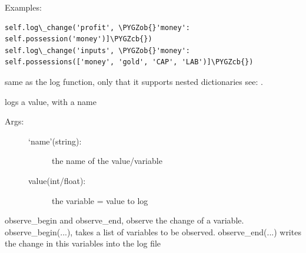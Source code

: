 \documentclass[letterpaper,10pt,english]{sphinxmanual}
\def\PYGZob{\char`\{}
\def\PYGZcb{\char`\}}
\begin{document}
\begin{fulllineitems}
\begin{fulllineitems}
Examples:

\begin{Verbatim}[commandchars=\\\{\}]
self.log\_change('profit', \PYGZob{}'money': self.possession('money')]\PYGZcb{})
self.log\_change('inputs', \PYGZob{}'money': self.possessions(['money', 'gold', 'CAP', 'LAB')]\PYGZcb{})
\end{Verbatim}

\end{fulllineitems}


\begin{fulllineitems}
\label{Database:database.Database.log_dict}
same as the log function, only that it supports nested dictionaries
see: .

\end{fulllineitems}


\begin{fulllineitems}
\label{Database:database.Database.log_value}
logs a value, with a name
\begin{description}
\item[{Args:}] \leavevmode\begin{description}
\item[{`name'(string):}] \leavevmode
the name of the value/variable

\item[{value(int/float):}] \leavevmode
the variable = value to log

\end{description}

\end{description}

\end{fulllineitems}


\begin{fulllineitems}
\label{Database:database.Database.observe_begin}
observe\_begin and observe\_end, observe the change of a variable.
observe\_begin(...), takes a list of variables to be observed.
observe\_end(...) writes the change in this variables into the log file


\end{fulllineitems}
\end{fulllineitems}
\end{document}
